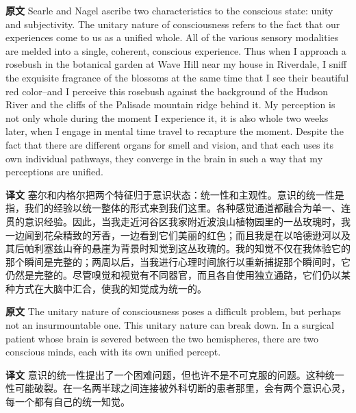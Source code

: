\documentclass[UTF8]{ctexart}
\newenvironment{english}{\par\small\noindent\textbf{原文}\quad\ignorespaces}{\par}
\newenvironment{zhtranslation}{\par\noindent\textbf{译文}\quad\ignorespaces}{\par\vspace{0.35em}}
\begin{document}
\begin{english}
Searle and Nagel ascribe two characteristics to the conscious state: unity and subjectivity. The unitary nature of consciousness refers to the fact that our experiences come to us as a unified whole. All of the various sensory modalities are melded into a single, coherent, conscious experience. Thus when I approach a rosebush in the botanical garden at Wave Hill near my house in Riverdale, I sniff the exquisite fragrance of the blossoms at the same time that I see their beautiful red color--and I perceive this rosebush against the background of the Hudson River and the cliffs of the Palisade mountain ridge behind it. My perception is not only whole during the moment I experience it, it is also whole two weeks later, when I engage in mental time travel to recapture the moment. Despite the fact that there are different organs for smell and vision, and that each uses its own individual pathways, they converge in the brain in such a way that my perceptions are unified.
\end{english}
\begin{zhtranslation}
塞尔和内格尔把两个特征归于意识状态：统一性和主观性。意识的统一性是指，我们的经验以统一整体的形式来到我们这里。各种感觉通道都融合为单一、连贯的意识经验。因此，当我走近河谷区我家附近波浪山植物园里的一丛玫瑰时，我一边闻到花朵精致的芳香，一边看到它们美丽的红色；而且我是在以哈德逊河以及其后帕利塞兹山脊的悬崖为背景时知觉到这丛玫瑰的。我的知觉不仅在我体验它的那个瞬间是完整的；两周以后，当我进行心理时间旅行以重新捕捉那个瞬间时，它仍然是完整的。尽管嗅觉和视觉有不同器官，而且各自使用独立通路，它们仍以某种方式在大脑中汇合，使我的知觉成为统一的。\end{zhtranslation}

\begin{english}
The unitary nature of consciousness poses a difficult problem, but perhaps not an insurmountable one. This unitary nature can break down. In a surgical patient whose brain is severed between the two hemispheres, there are two conscious minds, each with its own unified percept.
\end{english}
\begin{zhtranslation}
意识的统一性提出了一个困难问题，但也许不是不可克服的问题。这种统一性可能破裂。在一名两半球之间连接被外科切断的患者那里，会有两个意识心灵，每一个都有自己的统一知觉。\end{zhtranslation}
\end{document}
